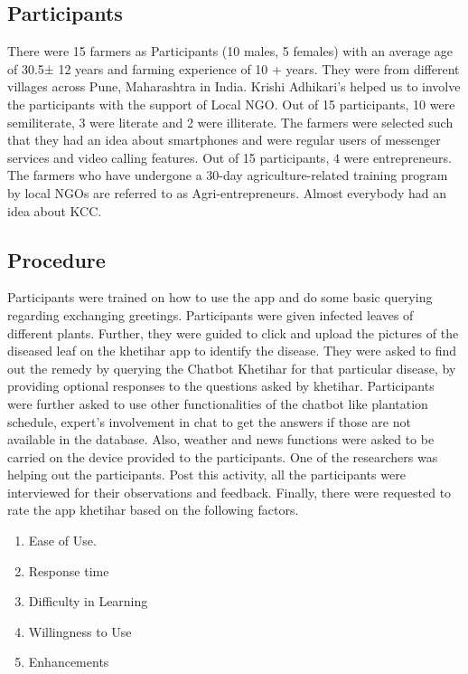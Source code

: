 \documentclass[10pt,conference]{IEEEtran}
\begin{document}
\subsection{Participants}


{\raggedright
There were 15 farmers as Participants (10 males, 5 females) with an average age of 30.5± 12 years and farming experience of 10 + years. They were from different villages across Pune, Maharashtra in India. Krishi Adhikari’s helped us to involve the participants with the support of Local NGO. Out of 15 participants, 10 were semiliterate, 3 were literate and 2 were illiterate. The farmers were selected such that they had an idea about smartphones and were regular users of messenger services and video calling features. Out of 15 participants, 4 were entrepreneurs. The farmers who have undergone a 30-day agriculture-related training program by local NGOs are referred to as Agri-entrepreneurs. Almost everybody had an idea about KCC.
}


\subsection{Procedure}


{\raggedright
Participants were trained on how to use the app and do some basic querying regarding exchanging greetings. Participants were given infected leaves of different plants. Further, they were guided to click and upload the pictures of the diseased leaf on the khetihar app to identify the disease. They were asked to find out the remedy by querying the Chatbot Khetihar for that particular disease, by providing optional responses to the questions asked by khetihar. Participants were further asked to use other functionalities of the chatbot like plantation schedule, expert's involvement in chat to get the answers if those are not available in the database. Also, weather and news functions were asked to be carried on the device provided to the participants. One of the researchers was helping out the participants. Post this activity, all the participants were interviewed for their observations and feedback. Finally, there were requested to rate the app khetihar based on the following factors.
}


\begin{enumerate}
	\item[] Ease of Use.
	\item[] Response time
	\item[] Difficulty in Learning
	\item[] Willingness to Use
	\item[] Enhancements
\end{enumerate}
\end{document}
